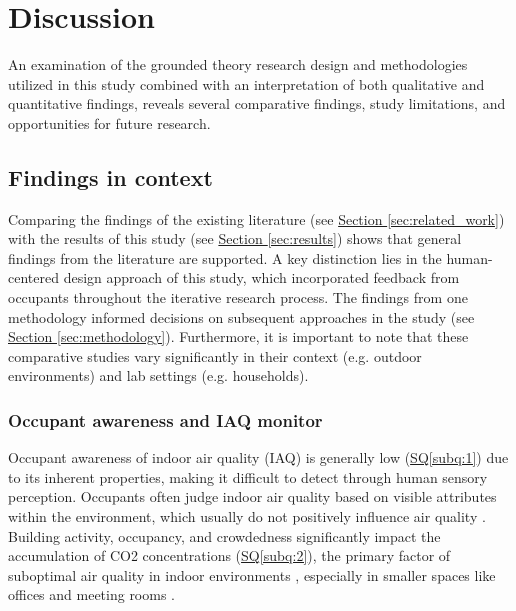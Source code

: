 \section{Discussion}
\label{sec:discussion}
An examination of the grounded theory research design and methodologies utilized in this study combined with an interpretation of both qualitative and quantitative findings, reveals several comparative findings, study limitations, and opportunities for future research.

\subsection{Findings in context}

Comparing the findings of the existing literature (see \hyperref[sec:related_work]{Section \ref*{sec:related_work}}) with the results of this study (see \hyperref[sec:results]{Section \ref*{sec:results}}) shows that general findings from the literature are supported. A key distinction lies in the human-centered design approach of this study, which incorporated feedback from occupants throughout the iterative research process. The findings from one methodology informed decisions on subsequent approaches in the study (see \hyperref[sec:methodology]{Section \ref*{sec:methodology}}). Furthermore, it is important to note that these comparative studies vary significantly in their context (e.g. outdoor environments) and lab settings (e.g. households).

\subsubsection{Occupant awareness and IAQ monitor}
Occupant awareness of indoor air quality (IAQ) is generally low (\hyperref[subq:1]{SQ\ref*{subq:1}}) due to its inherent properties, making it difficult to detect through human sensory perception. Occupants often judge indoor air quality based on visible attributes within the environment, which usually do not positively influence air quality \cite{schweizer_indoor_2007} \cite{corlan_importance_2021}. Building activity, occupancy, and crowdedness significantly impact the accumulation of CO2 concentrations (\hyperref[subq:2]{SQ\ref*{subq:2}}), the primary factor of suboptimal air quality in indoor environments \cite{fromme_indoor_2023} \cite{du_indoor_2020}, especially in smaller spaces like offices and meeting rooms \cite{zhong_complexity_2021}.

